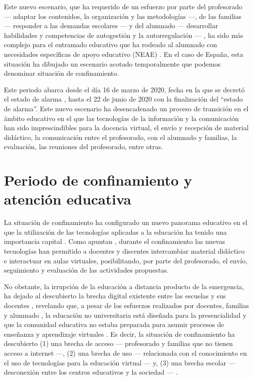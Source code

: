 \documentclass[spanish]{textolivre}
\begin{document}
Este nuevo escenario, que ha requerido de un esfuerzo por parte del profesorado — adaptar los contenidos, la organización y las metodologías —, de las familias — responder a las demandas escolares — \cite{rogero2020} %
y del alumnado — desarrollar habilidades y competencias de autogestión y la autorregulación — \cite{munoz2020}, %
ha sido más complejo para el entramado educativo que ha rodeado al alumnado con necesidades específicas de apoyo educativo (NEAE) \cite{murillo2020}. %
En el caso de España, esta situación ha dibujado un escenario acotado temporalmente que podemos denominar situación de confinamiento. 
	
Este periodo abarca desde el día 16 de marzo de 2020, fecha en la que se decretó el estado de alarma \cite{realdecreto}, %
hasta el 22 de junio de 2020 con la finalización del “estado de alarma”. Este nuevo escenario ha desencadenado un proceso de transición en el ámbito educativo en el que las tecnologías de la información y la comunicación han sido imprescindibles para la docencia virtual, el envío y recepción de material didáctico, la comunicación entre el profesorado, con el alumnado y familias, la evaluación, las reuniones del profesorado, entre otras. 

\section{Periodo de confinamiento y atención educativa}
La situación de confinamiento ha configurado un nuevo panorama educativo en el que la utilización de las tecnologías aplicadas a la educación ha tenido una importancia capital \cite{ruiz2020}. %
Como apuntan \textcite{menendez2020}, %
durante el confinamiento las nuevas tecnologías han permitido a docentes y discentes intercambiar material didáctico e interactuar en aulas virtuales, posibilitando, por parte del profesorado, el envío, seguimiento y evaluación de las actividades propuestas. 

No obstante, la irrupción de la educación a distancia producto de la emergencia, ha dejado al descubierto la brecha digital existente entre las escuelas y sus docentes \cite[p. 12]{murillo2020}, %
revelando que, a pesar de los esfuerzos realizados por docentes, familias y alumnado \cite{rogero2020}, %
la educación no universitaria está diseñada para la presencialidad \cite{cabreraperez2020} %
y que la comunidad educativa no estaba preparada para asumir procesos de enseñanza y aprendizaje virtuales \cite{penate2020}. %
Es decir, la situación de confinamiento ha descubierto (1) una brecha de acceso — profesorado y familias que no tienen acceso a internet —, (2) una brecha de uso — relacionada con el conocimiento en el uso de tecnologías para la educación virtual — y, (3) una brecha escolar — desconexión entre los centros educativos y la sociedad — \cite{cotec2020}. %
\end{document}
